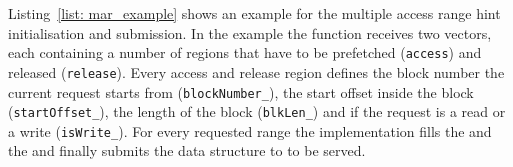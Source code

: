 Listing~\ref{list: mar_example} shows an example for the multiple access range hint initialisation and submission. In the example the  function receives two vectors, each containing a number of regions that have to be prefetched (\texttt{access}) and released (\texttt{release}). Every access and release region defines the block number the current request starts from (\texttt{blockNumber\_}), the start offset inside the block (\texttt{startOffset\_}), the length of the block (\texttt{blkLen\_}) and if the request is a read or a write (\texttt{isWrite\_}). For every requested range the implementation fills the  and the  and finally submits the data structure to  to be served.
